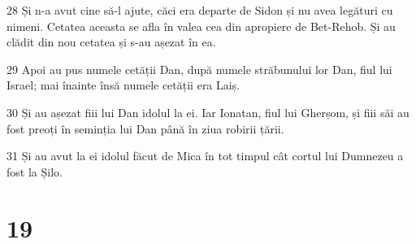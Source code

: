 \par 28 Și n-a avut cine să-l ajute, căci era departe de Sidon și nu avea legături cu nimeni. Cetatea aceasta se afla în valea cea din apropiere de Bet-Rehob. Și au clădit din nou cetatea și s-au așezat în ea.
\par 29 Apoi au pus numele cetății Dan, după numele străbunului lor Dan, fiul lui Israel; mai înainte însă numele cetății era Laiș.
\par 30 Și au așezat fiii lui Dan idolul la ei. Iar Ionatan, fiul lui Gherșom, și fiii săi au fost preoți în seminția lui Dan până în ziua robirii țării.
\par 31 Și au avut la ei idolul făcut de Mica în tot timpul cât cortul lui Dumnezeu a fost la Șilo.

\chapter{19}

